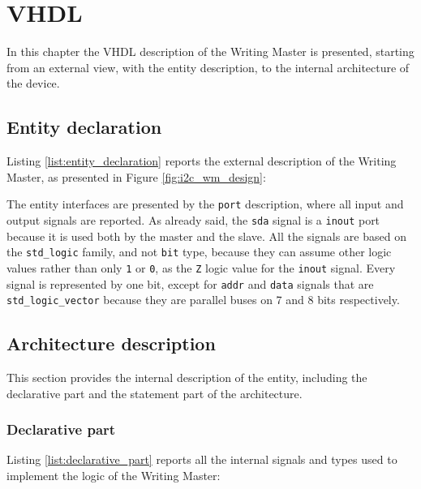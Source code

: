 
\chapter{VHDL}

In this chapter the VHDL description of the Writing Master is presented, starting from an external view, with the entity description, to the internal architecture of the device.


\section{Entity declaration}

Listing \ref{list:entity_declaration} reports the external description of the Writing Master, as presented in Figure \ref{fig:i2c_wm_design}:



The entity interfaces are presented by the \texttt{port} description, where all input and output signals are reported. As already said, the \texttt{sda} signal is a \texttt{inout} port because it is used both by the master and the slave. All the signals are based on the \texttt{std\_logic} family, and not \texttt{bit} type, because they can assume other logic values rather than only \texttt{1} or \texttt{0}, as the \texttt{Z} logic value for the \texttt{inout} signal. Every signal is represented by one bit, except for \texttt{addr} and \texttt{data} signals that are \texttt{std\_logic\_vector} because they are parallel buses on 7 and 8 bits respectively.

\section{Architecture description}

This section provides the internal description of the entity, including the declarative part and the statement part of the architecture.

\subsection{Declarative part}

Listing \ref{list:declarative_part} reports all the internal signals and types used to implement the logic of the Writing Master:

